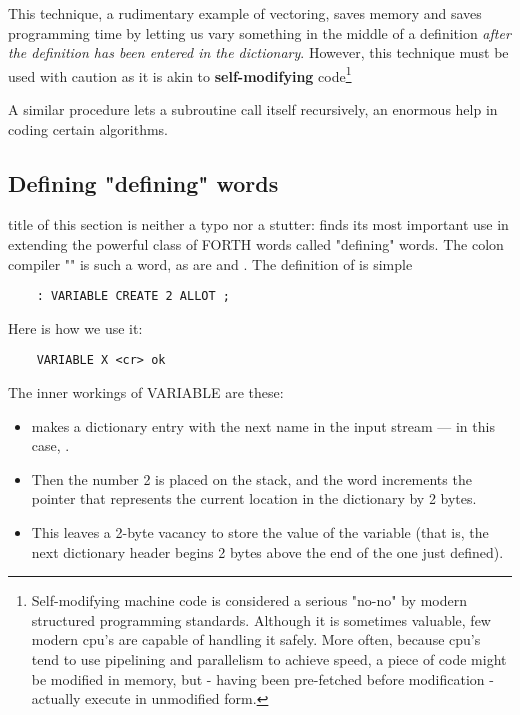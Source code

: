 This technique, a rudimentary example of vectoring, saves memory and saves programming time by letting us vary something in the middle of a definition \textit{after the definition has been entered in the dictionary}. However, this technique must be used with caution as it is akin to \textbf{self-modifying} code\footnote{Self-modifying machine code is considered a serious "no-no" by modern structured programming standards. Although it is sometimes valuable, few modern cpu's are capable of handling it safely. More often, because cpu's tend to use pipelining and parallelism to achieve speed, a piece of code might be modified in memory, but - having been pre-fetched before modification - actually execute in unmodified form.}

A similar procedure lets a subroutine call itself recursively, an enormous help in coding certain algorithms.

\subsection{Defining "defining" words}

 title of this section is neither a typo nor a stutter:  finds its most important use in extending the powerful class of FORTH words called "defining" words. The colon compiler "\bc{:}" is such a word, as are  and . The definition of  is simple

\begin{lstlisting}
    : VARIABLE CREATE 2 ALLOT ;
\end{lstlisting}

Here is how we use it:
\begin{lstlisting}
    VARIABLE X <cr> ok
\end{lstlisting}

The inner workings of VARIABLE are these:
\begin{itemize}
    \item {} makes a dictionary entry with the next name in the input stream — in this case, .
    \item Then the number 2 is placed on the stack, and the word  increments the pointer that represents the current location in the dictionary by 2 bytes.
    \item This leaves a 2-byte vacancy to store the value of the variable (that is, the next dictionary header begins 2 bytes above the end of the one just defined).
\end{itemize}

